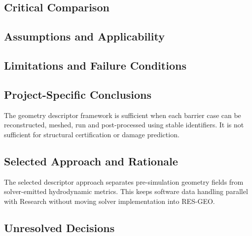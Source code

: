 
\subsection{Critical Comparison}
\label{sec:res-geo-met-critical-comparison}


\subsection{Assumptions and Applicability}
\label{sec:res-geo-met-assumptions}


\subsection{Limitations and Failure Conditions}
\label{sec:res-geo-met-limitations}


\subsection{Project-Specific Conclusions}
\label{sec:res-geo-met-conclusions}

The geometry descriptor framework is sufficient when each barrier case
can be reconstructed, meshed, run and post-processed using stable
identifiers. It is not sufficient for structural certification or
damage prediction.

\subsection{Selected Approach and Rationale}
\label{sec:res-geo-met-selected-approach}

The selected descriptor approach separates pre-simulation geometry
fields from solver-emitted hydrodynamic metrics. This keeps software
data handling parallel with Research without moving solver
implementation into RES-GEO.

\subsection{Unresolved Decisions}
\label{sec:res-geo-met-unresolved-decisions}

